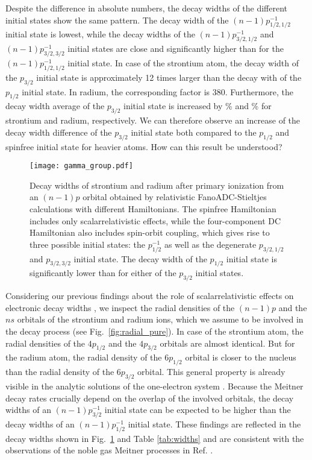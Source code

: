 \documentclass[aps,amssymb,preprint,a4paper]{revtex4}
\begin{document}
Despite the difference in absolute numbers, the decay widths
of the different initial states show the same pattern. The decay width of
the $(n-1)p_{1/2,1/2}^{-1}$ initial state is lowest, while the decay widths
of the $(n-1)p_{3/2,1/2}^{-1}$ and
$(n-1)p_{3/2,3/2}^{-1}$ initial states are close and significantly higher than
for the $(n-1)p_{1/2,1/2}^{-1}$ initial state.
In case of the strontium atom, the decay width of the $p_{3/2}$ initial state
is approximately 12 times larger than the decay with of the $p_{1/2}$ initial state.
In radium, the corresponding factor is 380.
Furthermore, the decay width average of the $p_{3/2}$ initial state is increased 
by \unit[114]{\%} and \unit[236]{\%} for strontium and radium, respectively.
We can therefore observe an increase
of the decay width difference of the $p_{3/2}$ initial state both
compared to the $p_{1/2}$ and spinfree initial state for heavier atoms.
How can this result be understood?

\begin{figure}[h]
 \centering
 \texttt{[image: gamma\_group.pdf]}
 \caption{Decay widths of strontium and radium after primary ionization from
          an $(n-1)p$ orbital obtained by relativistic FanoADC-Stieltjes
          calculations with different Hamiltonians. The spinfree Hamiltonian
          includes only scalarrelativistic effects, while the four-component
          DC Hamiltonian also includes spin-orbit coupling, which gives rise to
          three possible initial states: the $p_{1/2}^{-1}$ as well as the
          degenerate $p_{3/2,1/2}$ and $p_{3/2,3/2}$ initial state.
          The decay width of the $p_{1/2}$
          initial state is significantly lower than for either of the
          $p_{3/2}$ initial
          states.}
 \label{fig:gamma}
\end{figure}

Considering our previous findings about the role
of scalarrelativistic effects on electronic decay widths \cite{Fasshauer15_1},
we inspect the radial densities of the $(n-1)p$ and the $ns$ orbitals of the
strontium and radium ions,
which we assume to be involved in the decay process (see
Fig.~\ref{fig:radial_pure}).
In case of the strontium atom, the radial densities of the $4p_{1/2}$ and the
$4p_{3/2}$ orbitals are almost identical. But for the radium atom, the radial
density of the  $6p_{1/2}$ orbital is closer to the nucleus than
the radial density of the $6p_{3/2}$ orbital. This general property is already
visible in the analytic solutions of the one-electron system \cite{Bethe_Salpeter}.
Because the Meitner decay rates crucially depend on the overlap of the
involved orbitals, the decay widths of an $(n-1)p_{3/2}^{-1}$ initial state
can be expected to be higher than the decay widths of an $(n-1)p_{1/2}^{-1}$
initial state. These findings are reflected in the decay widths shown in
Fig.~\ref{fig:gamma} and Table \ref{tab:widths} and are consistent with the
observations of the noble gas Meitner processes in Ref. \cite{Fasshauer15_1}.
\end{document}

